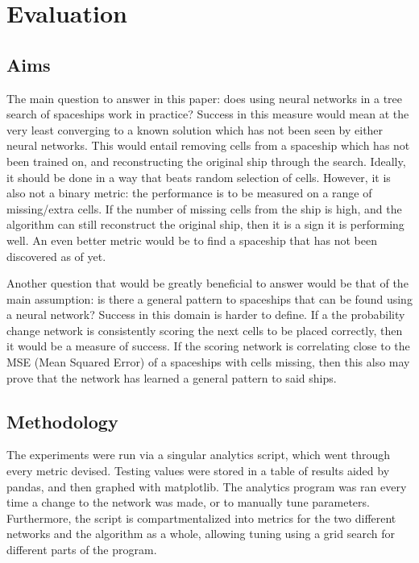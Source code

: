 \documentclass{l4proj}
\begin{document}
\chapter{Evaluation} 

\section{Aims}

The main question to answer in this paper: does using neural networks in a tree search of spaceships work in practice? Success in this measure would mean at the very least converging to a known solution which has not been seen by either neural networks. This would entail removing cells from a spaceship which has not been trained on, and reconstructing the original ship through the search. Ideally, it should be done in a way that beats random selection of cells. However, it is also not a binary metric: the performance is to be measured on a range of missing/extra cells. If the number of missing cells from the ship is high, and the algorithm can still reconstruct the original ship, then it is a sign it is performing well. An even better metric would be to find a spaceship that has not been discovered as of yet.

Another question that would be greatly beneficial to answer would be that of the main assumption: is there a general pattern to spaceships that can be found using a neural network? Success in this domain is harder to define. If a the probability change network is consistently scoring the next cells to be placed correctly, then it would be a measure of success. If the scoring network is correlating close to the MSE (Mean Squared Error) of a spaceships with cells missing, then this also may prove that the network has learned a general pattern to said ships.

\section{Methodology}

The experiments were run via a singular analytics script, which went through every metric devised. Testing values were stored in a table of results aided by pandas, and then graphed with matplotlib. The analytics program was ran every time a change to the network was made, or to manually tune parameters. Furthermore, the script is compartmentalized into metrics for the two different networks and the algorithm as a whole, allowing tuning using a grid search for different parts of the program. 
\end{document}
